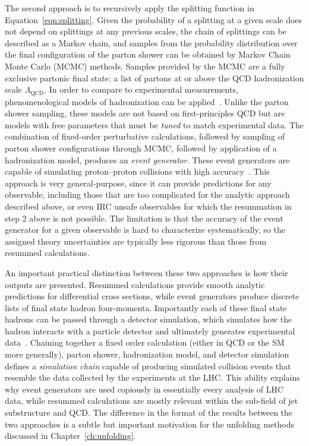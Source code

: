 The second approach is to recursively apply the splitting function in Equation~\ref{eqn:splitting}.
Given the probability of a splitting at a given scale does not depend on splittings at any previous scales, the chain of splittings can be described as a Markov chain, and samples from the probability distribution over the final configuration of the parton shower can be obtained by Markov Chain Monte Carlo (MCMC) methods.
Samples provided by the MCMC are a fully exclusive partonic final state: a list of partons at or above the QCD hadronization scale $\Lambda_{\mathrm{QCD}}$.
In order to compare to experimental measurements, phenomenological models of hadronization can be applied~\cite{Marchesini:1991ch, Sjostrand:2014zea}.
Unlike the parton shower sampling, these models are not based on first-principles QCD but are models with free parameters that must be \textit{tuned} to match experimental data.
The combination of fixed-order perturbative calculations, followed by sampling of parton shower configurations through MCMC, followed by application of a hadronization model, produces an \textit{event generator}.
These event generators are capable of simulating proton--proton collisions with high accuracy~\cite{Bierlich:2022pfr,Bellm:2015jjp,Sherpa:2019gpd}.
This approach is very general-purpose, since it can provide predictions for any observable, including those that are too complicated for the analytic approach described above, or even IRC unsafe observables for which the resummation in step 2 above is not possible.
The limitation is that the accuracy of the event generator for a given observable is hard to characterize systematically, so the assigned theory uncertainties are typically less rigorous than those from resummed calculations.

An important practical distinction between these two approaches is how their outputs are presented.
Resummed calculations provide smooth analytic predictions for differential cross sections, while event generators produce discrete lists of final state hadron four-momenta.
Importantly each of these final state hadrons can be passed through a detector simulation, which simulates how the hadron interacts with a particle detector and ultimately generates experimental data~\cite{GEANT4:2002zbu, ATLAS:2010arf}.
Chaining together a fixed order calculation (either in QCD or the SM more generally), parton shower, hadronization model, and detector simulation defines a \textit{simulation chain} capable of producing simulated collision events that resemble the data collected by the experiments at the LHC.
This ability explains why event generators are used copiously in essentially every analysis of LHC data, while resummed calculations are mostly relevant within the sub-field of jet substructure and QCD.
The difference in the format of the results between the two approaches is a subtle but important motivation for the unfolding methods discussed in Chapter~\ref{ch:unfolding}.

